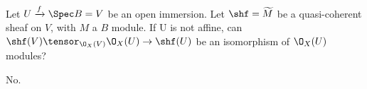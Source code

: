 \begin{question}
Let $U \xrightarrow{f} \Spec B = V$ be an open immersion.
Let $\shf=\widetilde{M}$ be a quasi-coherent sheaf on $V$, with $M$ a $B$ module. 
If U is not affine, can $\shf(V)\tensor_{\O_X(V)} \O_X(U) \rightarrow \shf(U)$ be an isomorphism of $\O_X(U)$ modules?
\end{question}
\begin{Qanswer}
No.
\end{Qanswer}